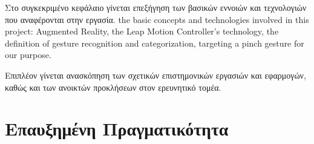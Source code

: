 

 \label{c:complex}

Στο συγκεκριμένο κεφάλαιο γίνεται επεξήγηση των βασικών εννοιών και τεχνολογιών που αναφέρονται στην εργασία.  the basic concepts and technologies involved in this project: Augmented Reality, the Leap Motion Controller’s technology, the definition of gesture recognition and categorization, targeting a pinch gesture for our purpose. 

Επιπλέον γίνεται ανασκόπηση των σχετικών επιστημονικών εργασιών και εφαρμογών, καθώς και των ανοικτών προκλήσεων στον ερευνητικό τομέα.



\section{Επαυξημένη Πραγματικότητα}


